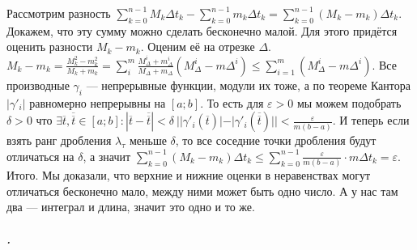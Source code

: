 \documentclass{article}
\begin{document}
\begin{itemize}
\begin{Proof}
            Рассмотрим разность $\sum\limits_{k=0}^{n-1}M_k\Delta t_k-\sum\limits_{k=0}^{n-1}m_k\Delta t_k=\sum\limits_{k=0}^{n-1}(M_k-m_k)\Delta t_k$. Докажем, что эту сумму можно сделать бесконечно малой. Для этого придётся оценить разности $M_k-m_k$. Оценим её на отрезке $\Delta$. $M_k-m_k=\frac{M_k^2-m_k^2}{M_k+m_k}=\sum\limits_i^m\frac{M_\Delta^i+m_\Delta^i}{M_\Delta+m_\Delta}(M_\Delta^i-m\Delta^i)\leqslant\sum\limits_{i=1}^m(M_\Delta^i-m\Delta^i)$. Все производные $\gamma_i$ --- непрерывные функции, модули их тоже, а по теореме Кантора $|\gamma'_i|$ равномерно непрерывны на $[a;b]$. То есть для $\varepsilon>0$ мы можем подобрать $\delta>0$ что $\exists\overline t,\overline{\overline t}\in[a;b]:|\overline t-\overline{\overline t}|<\delta~||\gamma'_i(\overline t)|-|\gamma'_i(\overline{\overline t})||<\frac{\varepsilon}{m(b-a)}$. И теперь если взять ранг дробления $\lambda_\tau$ меньше $\delta$, то все соседние точки дробления будут отличаться на $\delta$, а значит $\sum\limits_{k=0}^{n-1}(M_k-m_k)\Delta t_k\leqslant\sum\limits_{k=0}^{n-1}\frac\varepsilon{m(b-a)}\cdot m\Delta t_k=\varepsilon$. Итого. Мы доказали, что верхние и нижние оценки в неравенствах могут отличаться бесконечно мало, между ними может быть одно число. А у нас там два --- интеграл и длина, значит это одно и то же.
        \end{Proof}
    \end{itemize}
    \subparagraph{.}
\end{document}

